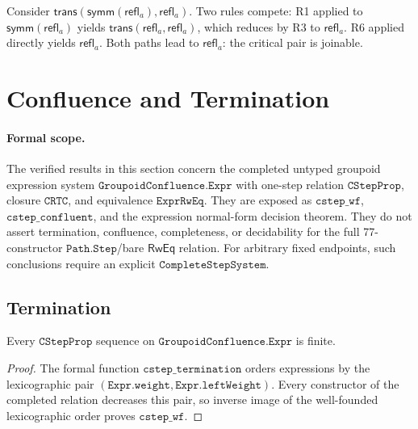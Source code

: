 \documentclass[manuscript]{BSLstyle}
\newcommand{\refl}{\mathsf{refl}}
\newcommand{\symm}{\mathsf{symm}}
\newcommand{\trans}{\mathsf{trans}}
\newcommand{\RwEq}{\mathsf{RwEq}}
\begin{document}
\begin{example}\label{ex:critical-pair}
Consider $\trans(\symm(\refl_a), \refl_a)$.  Two rules compete:
R1 applied to $\symm(\refl_a)$ yields $\trans(\refl_a, \refl_a)$, which
reduces by R3 to $\refl_a$.  R6 applied directly yields $\refl_a$.
Both paths lead to $\refl_a$: the critical pair is joinable.
\end{example}

\section{Confluence and Termination}\label{sec:confluence}

\paragraph{Formal scope.}
The verified results in this section concern the completed untyped groupoid
expression system
\(\texttt{GroupoidConfluence.Expr}\) with one-step relation
\(\texttt{CStepProp}\), closure \(\texttt{CRTC}\), and equivalence
\(\texttt{ExprRwEq}\).  They are exposed as
\(\texttt{cstep\_wf}\), \(\texttt{cstep\_confluent}\), and the
expression normal-form decision theorem.  They do not assert termination,
confluence, completeness, or decidability for the full 77-constructor
\(\texttt{Path.Step}\)/bare \(\RwEq\) relation.  For arbitrary fixed endpoints,
such conclusions require an explicit \(\texttt{CompleteStepSystem}\).

\subsection{Termination}

\begin{theorem}\label{thm:termination}
Every \(\texttt{CStepProp}\) sequence on
\(\texttt{GroupoidConfluence.Expr}\) is finite.
\end{theorem}

\begin{proof}
The formal function \(\texttt{cstep\_termination}\) orders expressions by the
lexicographic pair \((\texttt{Expr.weight},\texttt{Expr.leftWeight})\).
Every constructor of the completed relation decreases this pair, so inverse
image of the well-founded lexicographic order proves \(\texttt{cstep\_wf}\).
\end{proof}
\end{document}
